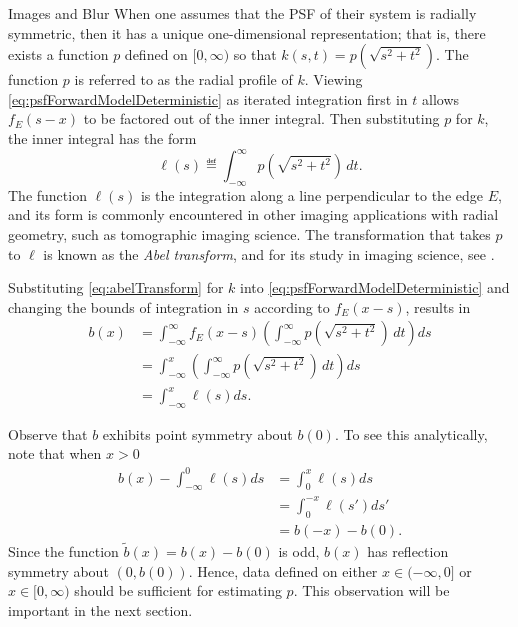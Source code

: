 \begin{chapter}{Images and Blur}
  When one assumes that the PSF of their system is radially symmetric, then it has a unique one-dimensional representation; that is, there exists a function $p$ defined on $[0,\infty)$ so that $k(s,t) = p\left(\sqrt{s^2 + t^2}\right)$.  
  The function $p$ is referred to as the radial profile of $k$.
  Viewing \eqref{eq:psfForwardModelDeterministic} as iterated integration first in $t$ allows $f_E(s-x)$ to be factored out of the inner integral. 
  Then substituting $p$ for $k$, the inner integral has the form
  \begin{equation} \label{eq:abelTransform}
    \ell(s) \eqdef \int_{-\infty}^\infty p\left(\sqrt{s^2 + t^2}\right)\,dt.
  \end{equation}
  The function $\ell(s)$ is the integration along a line perpendicular to the edge $E$, and its form is commonly encountered in other imaging applications with radial geometry, such as tomographic imaging science.
  The transformation that takes $p$ to $\ell$ is known as the \emph{Abel transform}, and for its study in imaging science, see \citep{bracewell,epstein2008,knill93}.

  Substituting \eqref{eq:abelTransform} for $k$ into  \eqref{eq:psfForwardModelDeterministic} and changing the bounds of integration in $s$ according to $f_E(x-s)$, results in
  \begin{align}
    b(x) &= \int_{-\infty}^\infty f_E(x-s) \left(\int_{-\infty}^\infty p\left(\sqrt{s^2 + t^2}\right)\,dt\right)ds \nonumber \\
         &= \int_{-\infty}^x \left(\int_{-\infty}^\infty p\left(\sqrt{s^2 + t^2}\right)\,dt\right)ds \nonumber \\
         &= \int_{-\infty}^x \ell(s)ds. \label{eq:abelForward}
  \end{align}

  Observe that $b$ exhibits point symmetry about $b(0)$.
  To see this analytically, note that when $x>0$ 
  \begin{align}
    b(x) - \int_{-\infty}^0 \ell(s)ds 
      &= \int_0^x \ell(s)ds \nonumber \\
      &= \int_0^{-x}\ell(s')ds'  \nonumber \\
      &= b(-x) - b(0).
  \end{align}
  Since the function $\tilde b(x) = b(x) - b(0)$ is odd, $b(x)$ has reflection symmetry about $(0,b(0))$.
  Hence, data defined on either $x\in(-\infty,0]$ or $x\in[0,\infty)$ should be sufficient for estimating $p$.
  This observation will be important in the next section.


\end{chapter}
